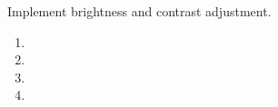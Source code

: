 Implement brightness and contrast adjustment.

\begin{enumerate}
    \item 
    \item 
    \item 
    \item 
\end{enumerate}